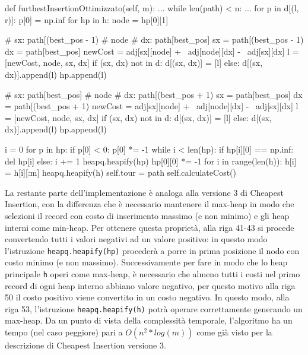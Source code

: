 \documentclass[a4paper,12pt]{report}
\begin{document}
\begin{python}
def furthestInsertionOttimizzato(self, m):
  ...
  while len(path) < n:
    ...
    for p in d[(l, r)]:
      p[0] = np.inf
    for hp in h:
      node = hp[0][1]

      # sx: path[(best_pos - 1) %
      # node
      # dx: path[best_pos]
      sx = path[(best_pos - 1) %
      dx = path[best_pos]
      newCost = adj[sx][node] + \
                adj[node][dx] - \
                adj[sx][dx]
      l = [newCost, node, sx, dx]
      if (sx, dx) not in d:
        d[(sx, dx)] = [l]
      else:
        d[(sx, dx)].append(l)
      hp.append(l)

      # sx: path[best_pos]
      # node
      # dx: path[(best_pos + 1) %
      sx = path[best_pos]
      dx = path[(best_pos + 1) %
      newCost = adj[sx][node] + \
                adj[node][dx] - \
                adj[sx][dx]
      l = [newCost, node, sx, dx]
      if (sx, dx) not in d:
        d[(sx, dx)] = [l]
      else:
        d[(sx, dx)].append(l)
      hp.append(l)

      i = 0
      for p in hp:
        if p[0] < 0:
          p[0] *= -1
      while i < len(hp):
        if hp[i][0] == np.inf:
          del hp[i]
        else:
          i += 1
      heapq.heapify(hp)
      hp[0][0] *= -1
    for i in range(len(h)):
      h[i] = h[i][:m]
    heapq.heapify(h)
  self.tour = path
  self.calculateCost()
\end{python}
La restante parte dell'implementazione è analoga alla versione 3 di Cheapest Insertion, con la differenza che è necessario mantenere il max-heap in modo che selezioni il record con costo di inserimento massimo (e non minimo) e gli heap interni come min-heap. Per ottenere questa proprietà, alla riga 41-43 si procede convertendo tutti  i valori negativi ad un valore positivo: in questo modo l'istruzione \lstinline!heapq.heapify(hp)! procederà a porre in prima posizione il nodo con costo minimo (e non massimo). Successivamente per fare in modo che lo heap principale \lstinline!h! operi come max-heap, è necessario che almeno tutti i costi nel primo record di ogni heap interno abbiano valore negativo, per questo motivo alla riga 50 il costo positivo viene convertito in un costo negativo. In questo modo, alla riga 53, l'istruzione \lstinline!heapq.heapify(h)! potrà operare correttamente generando un max-heap. \newline
Da un punto di vista della complessità temporale, l'algoritmo ha un tempo (nel caso peggiore) pari a $O(n^2 * log(m))$ come già visto per la descrizione di Cheapest Insertion versione 3.
\end{document}
